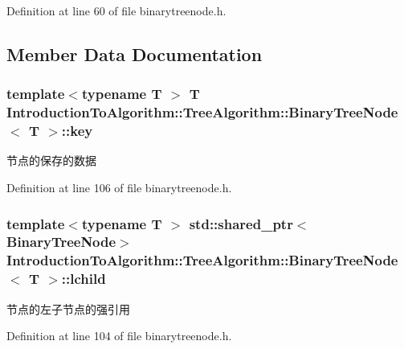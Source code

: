 Definition at line 60 of file binarytreenode.\+h.



\subsection{Member Data Documentation}
\hypertarget{struct_introduction_to_algorithm_1_1_tree_algorithm_1_1_binary_tree_node_ad0f9224668ce545453577be37c11e99c}{}
\subsubsection[{key}]{\setlength{\rightskip}{0pt plus 5cm}template$<$typename T $>$ T {\bf Introduction\+To\+Algorithm\+::\+Tree\+Algorithm\+::\+Binary\+Tree\+Node}$<$ T $>$\+::key}\label{struct_introduction_to_algorithm_1_1_tree_algorithm_1_1_binary_tree_node_ad0f9224668ce545453577be37c11e99c}
节点的保存的数据 

Definition at line 106 of file binarytreenode.\+h.

\hypertarget{struct_introduction_to_algorithm_1_1_tree_algorithm_1_1_binary_tree_node_a2d776837c806f27641a4128f2f3ebf34}{}
\subsubsection[{lchild}]{\setlength{\rightskip}{0pt plus 5cm}template$<$typename T $>$ std\+::shared\+\_\+ptr$<${\bf Binary\+Tree\+Node}$>$ {\bf Introduction\+To\+Algorithm\+::\+Tree\+Algorithm\+::\+Binary\+Tree\+Node}$<$ T $>$\+::lchild}\label{struct_introduction_to_algorithm_1_1_tree_algorithm_1_1_binary_tree_node_a2d776837c806f27641a4128f2f3ebf34}
节点的左子节点的强引用 

Definition at line 104 of file binarytreenode.\+h.

\hypertarget{struct_introduction_to_algorithm_1_1_tree_algorithm_1_1_binary_tree_node_ab0f7e754f706b71943e8453c66485fd4}{}
